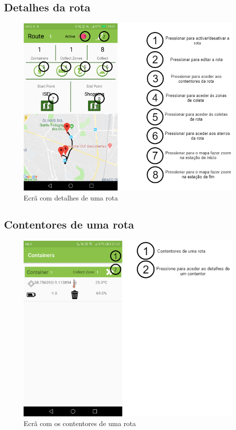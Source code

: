 \documentclass[10pt,a5paper]{article}
\begin{document}
\newpage
\subsection{Detalhes da rota} 

\begin{figure}[!h]
	\centering
	\includegraphics[width=1.1\textwidth]{Images/screens/route_screen}
	\caption{Ecrã com detalhes de uma rota}
	\label{fig:route_screen}
\end{figure}

\newpage
\subsection{Contentores de uma rota} 

\begin{figure}[!h]
	\centering
	\includegraphics[width=1.1\textwidth]{Images/screens/route_containers_screen}
	\caption{Ecrã com os contentores de uma rota}
	\label{fig:route_containers_screen}
\end{figure}
\end{document}
